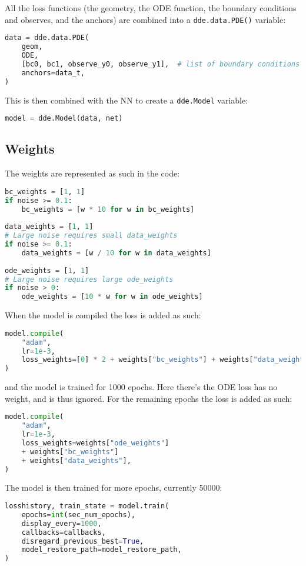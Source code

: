 \documentclass[a4paper]{article}
\begin{document}
All the loss functions (the geometry, the ODE function, the boundary conditions and observes, and the anchors) are combined into a \lstinline|dde.data.PDE()| variable:
\begin{lstlisting}[language=python]
data = dde.data.PDE(  
	geom,
	ODE,
	[bc0, bc1, observe_y0, observe_y1],  # list of boundary conditions
	anchors=data_t,
)
\end{lstlisting}
This is then combined with the NN to create a \lstinline|dde.Model| variable:
\begin{lstlisting}[language=python]
model = dde.Model(data, net)
\end{lstlisting}


\subsection{Weights}

The weights are represented as such in the code:
\begin{lstlisting}[language=python]
bc_weights = [1, 1]
if noise >= 0.1:
	bc_weights = [w * 10 for w in bc_weights]
	
data_weights = [1, 1]
# Large noise requires small data_weights
if noise >= 0.1:
	data_weights = [w / 10 for w in data_weights]
	
ode_weights = [1, 1]
# Large noise requires large ode_weights
if noise > 0:
	ode_weights = [10 * w for w in ode_weights]
\end{lstlisting}

When the model is compiled the loss is added as such:
\begin{lstlisting}[language=python]
model.compile(
	"adam",
	lr=1e-3,
	loss_weights=[0] * 2 + weights["bc_weights"] + weights["data_weights"],
)
\end{lstlisting}
and the model is trained for 1000 epochs. 
Here there's the ODE loss has no weight, and is thus ignored. 
For the remaining epochs the loss is added as such:
\begin{lstlisting}[language=python]
model.compile(
	"adam",
	lr=1e-3,
	loss_weights=weights["ode_weights"]
	+ weights["bc_weights"]
	+ weights["data_weights"],
)
\end{lstlisting}
The model is then trained for more epochs, currently 50000:
\begin{lstlisting}[language=python]
losshistory, train_state = model.train(
	epochs=int(sec_num_epochs),
	display_every=1000,
	callbacks=callbacks,
	disregard_previous_best=True,
	model_restore_path=model_restore_path,
)
\end{lstlisting}
\end{document}
